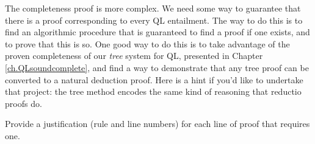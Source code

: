 The completeness proof is more complex. We need some way to guarantee that there is a proof corresponding to every QL entailment. The way to do this is to find an algorithmic procedure that is guaranteed to find a proof if one exists, and to prove that this is so. One good way to do this is to take advantage of the proven completeness of our \emph{tree} system for QL, presented in Chapter \ref{ch.QLsoundcomplete}, and find a way to demonstrate that any tree proof can be converted to a natural deduction proof. Here is a hint if you'd like to undertake that project: the tree method encodes the same kind of reasoning that reductio proofs do.



\iffalse

\practiceproblems

\solutions
\problempart
\label{pr.justifyQLproof}
Provide a justification (rule and line numbers) for each line of proof that requires one.
